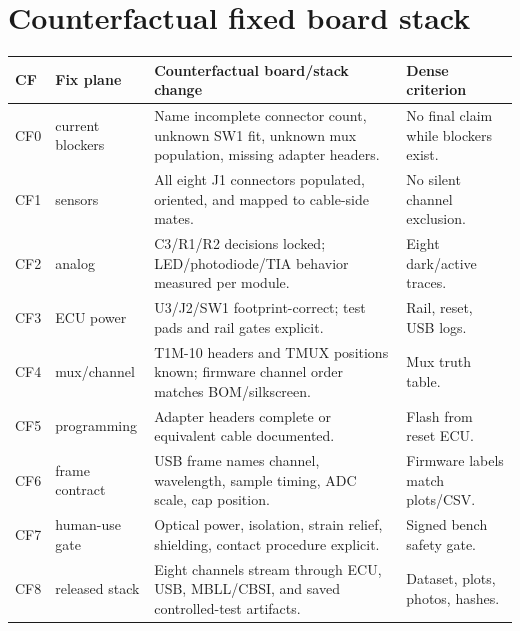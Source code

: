 \documentclass[10pt]{article}
\begin{document}
\section{Counterfactual fixed board stack}

\begin{center}
\end{center}

\begin{center}\scriptsize
\begin{tabular}{|L{0.42in}|L{1.0in}|L{2.55in}|L{1.85in}|}
\hline
\textbf{CF} & \textbf{Fix plane} & \textbf{Counterfactual board/stack change} & \textbf{Dense criterion} \\
\hline
CF0 & current blockers & Name incomplete connector count, unknown SW1 fit, unknown mux population, missing adapter headers. & No final claim while blockers exist. \\
\hline
CF1 & sensors & All eight J1 connectors populated, oriented, and mapped to cable-side mates. & No silent channel exclusion. \\
\hline
CF2 & analog & C3/R1/R2 decisions locked; LED/photodiode/TIA behavior measured per module. & Eight dark/active traces. \\
\hline
CF3 & ECU power & U3/J2/SW1 footprint-correct; test pads and rail gates explicit. & Rail, reset, USB logs. \\
\hline
CF4 & mux/channel & T1M-10 headers and TMUX positions known; firmware channel order matches BOM/silkscreen. & Mux truth table. \\
\hline
CF5 & programming & Adapter headers complete or equivalent cable documented. & Flash from reset ECU. \\
\hline
CF6 & frame contract & USB frame names channel, wavelength, sample timing, ADC scale, cap position. & Firmware labels match plots/CSV. \\
\hline
CF7 & human-use gate & Optical power, isolation, strain relief, shielding, contact procedure explicit. & Signed bench safety gate. \\
\hline
CF8 & released stack & Eight channels stream through ECU, USB, MBLL/CBSI, and saved controlled-test artifacts. & Dataset, plots, photos, hashes. \\
\hline
\end{tabular}
\end{center}
\end{document}
